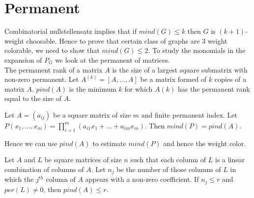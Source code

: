 \section{Permanent}
Combinatorial nullstellensatz implies that if $mind(G) \leq k$ then $G$ is $(k + 1)$-weight choosable. Hence to prove that certain class of graphs are $3$ weight colorable, we need to show that $mind(G) \leq 2$. To study the monomials in the expansion of $P_G$ we look at the permanent of matrices.
\\
The permanent rank of a matrix $A$ is the size of a largest square submatrix with non-zero permanent. Let $A^{(k)} = [A, \ldots , A]$ be a matrix formed of $k$ copies of a matrix $A$. $pind(A)$ is the minimum $k$ for which $A(k)$ has the permanent rank equal to the size of $A$.
\begin{lemma}
	Let $A = (a_{ij})$ be a square matrix of size $m$ and finite permanent index. Let $P(x_1 , \ldots , x_m)=\prod_{i=1}^{m}(a_{i1} x_1 + \ldots + a_{im} x_m)$. Then $mind(P) = pind(A)$. 
\end{lemma}
Hence we can use $pind(A)$ to estimate $mind(P)$ and hence the weight color.
\begin{lemma}
	Let $A$ and $L$ be square matrices of size $n$ such that each column of $L$ is a linear combination of columns of $A$. Let $n_j$ be the number of those columns of $L$ in which the $j^{th}$ column of $A$ appears with a non-zero coefficient. If $n_j \leq r$ and $per(L) \neq 0$, then $pind(A) \leq r$.
\end{lemma}